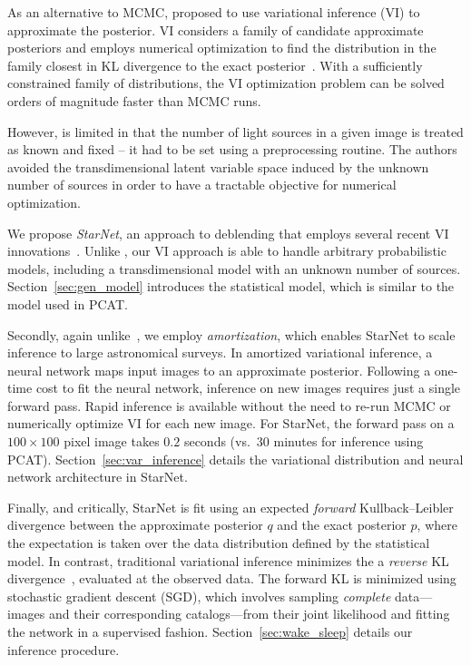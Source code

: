 As an alternative to MCMC, \cite{regier2019_celeste} proposed to use variational inference (VI)
to approximate the posterior.
VI considers a family of candidate approximate posteriors and employs numerical optimization to find the distribution in the family closest
in KL divergence to the exact posterior~\citep{Jordan_intro_vi, Wainwrite_graph_models_vi, Blei_2017_vi_review}.
With a sufficiently constrained family of distributions, the VI optimization problem can be solved orders of magnitude faster than MCMC runs.

However, \cite{regier2019_celeste} is limited in that the number of light sources in a given image is treated as known and fixed -- it had to be set using a preprocessing routine.
The authors avoided the transdimensional latent variable space induced by
the unknown number of sources
in order to have a tractable objective for numerical optimization.

\bigbreak


\nopagebreak[4]

We propose {\itshape StarNet}, an approach to deblending that employs several recent VI innovations~\citep{zhang2019advances,le2020revisiting}.
Unlike \cite{regier2019_celeste}, our VI approach is able to handle arbitrary probabilistic models, including a transdimensional model with an unknown number of sources. Section~\ref{sec:gen_model} introduces the statistical model, which is similar to the model used in PCAT.

Secondly, again unlike~\cite{regier2019_celeste},
we employ {\itshape amortization}, which enables StarNet to scale inference to large astronomical surveys.
In amortized variational inference, a neural network maps input images to an approximate posterior.
Following a one-time cost to fit the neural network, inference
on new images requires just a single forward pass.
Rapid inference is available without the need to re-run MCMC or numerically optimize VI for each new image.
For StarNet, the forward pass on
a $100 \times 100$ pixel image takes $0.2$ seconds (vs.~30 minutes for inference using PCAT).
Section~\ref{sec:var_inference} details the variational distribution and neural network architecture in StarNet.

Finally, and critically, StarNet is fit using an expected
\textit{forward} Kullback–Leibler divergence
between the approximate posterior $q$ and the exact posterior $p$,
where the expectation is taken over the data distribution defined by the statistical model. 
In contrast, traditional variational inference minimizes the a \textit{reverse}
KL divergence~\citep{bishop2006pattern}, evaluated at the observed data.
The forward KL is minimized using stochastic gradient descent (SGD),
which involves sampling {\itshape complete} data---images and their corresponding catalogs---from
their joint likelihood and fitting the network in a supervised fashion.
Section~\ref{sec:wake_sleep} details our inference procedure.

